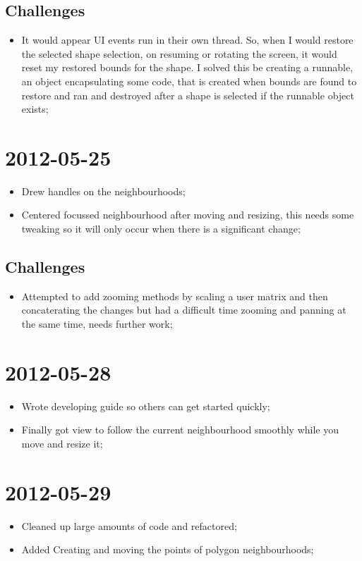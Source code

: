 \documentclass{report}
\begin{document}
\subsection*{Challenges}
\begin{itemize}
  \item 
    It would appear UI events run in their own thread. So, when I would restore the selected shape selection, on resuming or rotating the screen, it would reset my restored bounds for the shape. I solved this be creating a runnable, an object encapsulating some code, that is created when bounds are found to restore and ran and destroyed after a shape is selected if the runnable object exists;
\end{itemize}

\section*{2012-05-25}
\begin{itemize}
  \item 
    Drew handles on the neighbourhoods;
  \item
    Centered focussed neighbourhood after moving and resizing, this needs some tweaking so it will only occur when there is a significant change;
\end{itemize}
\subsection*{Challenges}
\begin{itemize}
  \item 
    Attempted to add zooming methods by scaling a user matrix and then concaterating the changes but had a difficult time zooming and panning at the same time, needs further work;
\end{itemize}

\section*{2012-05-28}
\begin{itemize}
  \item 
    Wrote developing guide so others can get started quickly;
  \item
    Finally got view to follow the current neighbourhood smoothly while you move and resize it;
\end{itemize}

\section*{2012-05-29}
\begin{itemize}
  \item 
    Cleaned up large amounts of code and refactored;
  \item
    Added Creating and moving the points of polygon neighbourhoods;
\end{itemize}
\end{document}
